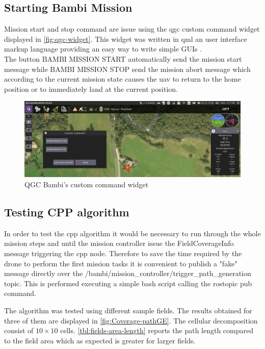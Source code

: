 \subsection{Starting Bambi Mission} %
\label{sub:starting_bambi_mission}
Mission start and stop command are issue using the \acrshort{qgc} custom command widget displayed in \autoref{fig:qgc-widget}. This widget was written in \acrfull{qml} an user interface markup language providing an easy way to write simple GUIs \cite{QML}.\\
The button \textsf{BAMBI MISSION START} automatically send the mission start message while \textsf{BAMBI MISSION STOP} send the mission abort message which according to the current mission state causes the \acrshort{uav} to return to the home position or to immediately land at the current position.
\begin{figure}[ht]
  \centering
  \includegraphics[width=.9\linewidth]{figures/C3/simulation/qgc-widget.png}
  \caption{QGC Bambi's custom command widget}
  \label{fig:qgc-widget}
\end{figure}

\subsection{Testing CPP algorithm} %
\label{sub:testing_cpp_algorithm}
In order to test the \acrlong{cpp} algorithm it would be necessary to run through the whole mission steps and until the mission controller issue the \textsf{FieldCoverageInfo} message triggering the \acrshort{cpp} node. Therefore to save the time required by the drone to perform the first mission tasks it is convenient to publish a "fake" message directly over the \textsf{/bambi/mission\_controller/trigger\_path\_generation} topic. This is performed executing a simple bash script calling the \textsf{rostopic pub} command.\par
The algorithm was tested using different sample fields. The results obtained for three of them are displayed in \autoref{fig:Coverage-pathGE}. The cellular decomposition consist of $10 \times 10$ cells. \autoref{tbl:fields-area-length} reports the path length compared to the field area which as expected is greater for larger fields.

